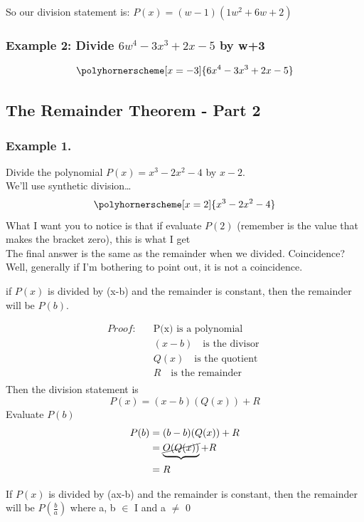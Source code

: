 \documentclass{article}
\begin{document}
So our division statement is: $P(x)=(w-1)(1w^2+6w+2)$
\subsubsection*{Example 2: Divide $6w^4-3x^3+2x-5$ by w+3 }
$$\polyhornerscheme[x=-3]{6x^4-3x^3+2x-5}$$
\newpage 
\subsection{The Remainder Theorem - Part 2}
\subsubsection*{Example 1.} Divide the polynomial $P(x)=x^3-2x^2-4$ by $x-2$.\\
We’ll use synthetic division…
$$\polyhornerscheme[x=2]{x^3-2x^2-4}$$
What I want you to notice is that if evaluate $P(2)$ (remember is the value that makes the bracket zero), this is what I get \\
The final answer is the same as the remainder when we divided. Coincidence? Well, generally if I'm bothering to point out, it is not a coincidence.

\begin{tcolorbox}[enhanced,attach boxed title to top center={yshift=-3mm,yshifttext=-1mm},
  colback=antiquefuchsia!5!white,colframe=antiquefuchsia!75!black,colbacktitle=purple!80!black,
  title=The Remainder Theorm,fonttitle=\bfseries,
  boxed title style={size=small,colframe=red!50!black} ]
 if $P(x)$ is divided by (x-b) and the remainder is constant, then the remainder will be $P(b)$.
\end{tcolorbox}
\begin{align*}
    \textit{Proof:} \quad & \text{P(x) is a polynomial}\\
    &(x-b) \quad \text{is the divisor }\\
    &Q(x) \quad \text{is the quotient }\\
    & R \quad \text{is the remainder }\\
\end{align*}
Then the division statement is
$$
P(x)=(x-b)(Q(x))+R
$$
Evaluate $P(b)$
$$
\begin{aligned}
P(b) & =(b-b)(Q(x))+R \\
& =\underbrace{\cancel{O(Q(x))}}+R_{} \\ 
& =R
\end{aligned}
$$
\begin{tcolorbox}[enhanced,frame style image=blueshade.png,
  opacityback=0.75,opacitybacktitle=0.25,
  colback=blue!5!white,colframe=blue!75!black,
  title=The General Remainder Theorem]
 If $P(x)$ is divided by (ax-b) and the remainder is constant, then the remainder will be $P\left(\frac{b}{a}\right)$ where a, b $\in$ I and a $\neq$ 0
\end{tcolorbox}
\end{document}
